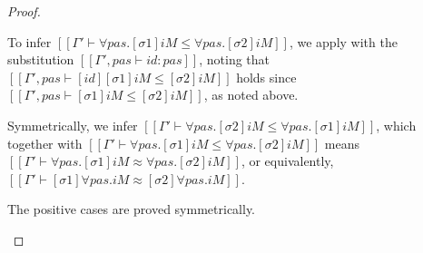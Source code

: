 \begin{proof}
\begin{caseof}
      To infer
      $[[Γ' ⊢ ∀pas.[σ1]iM ≤ ∀pas.[σ2]iM]]$,
      we apply 
      with the substitution $[[Γ', pas ⊢ id : pas]]$, 
      noting that $[[Γ', pas ⊢ [id][σ1]iM ≤ [σ2]iM ]]$
      holds since $[[Γ', pas ⊢ [σ1]iM ≤ [σ2]iM ]]$, 
      as noted above. 

      Symmetrically, we infer
      $[[Γ' ⊢ ∀pas.[σ2]iM ≤ ∀pas.[σ1]iM]]$,
      which together with
      $[[Γ' ⊢ ∀pas.[σ1]iM ≤ ∀pas.[σ2]iM]]$
      means
      $[[Γ' ⊢ ∀pas.[σ1]iM ≈ ∀pas.[σ2]iM]]$,
      or equivalently, 
      $[[Γ' ⊢ [σ1]∀pas.iM ≈ [σ2]∀pas.iM]]$.

    \item The positive cases are proved symmetrically.
  \end{caseof}
\end{proof}

